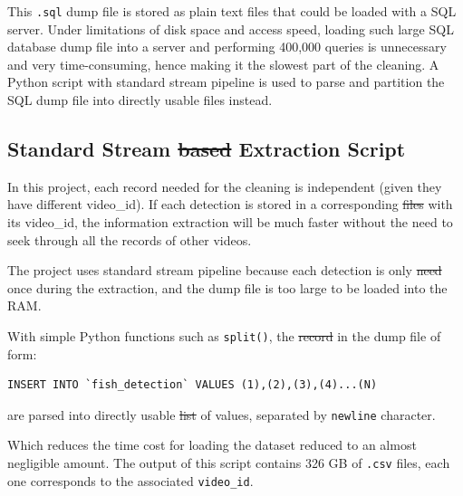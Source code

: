 \documentclass[bsc,logo,twoside,fullspacing,parskip]{infthesis}
\providecommand{\DIFadd}[1]{{\protect\color{blue}\uwave{#1}}} %
\providecommand{\DIFdel}[1]{{\protect\color{red}\sout{#1}}}                      %
\providecommand{\DIFaddbegin}{} %
\providecommand{\DIFaddend}{} %
\providecommand{\DIFdelbegin}{} %
\providecommand{\DIFdelend}{} %
\newcommand{\DIFscaledelfig}{0.5}
\newlength{\DIFdelgraphicswidth} %
\newlength{\DIFdelgraphicsheight} %
\newcommand{\DIFaddincludegraphics}[2][]{{\color{blue}\fbox{\DIFOincludegraphics[#1]{#2}}}} %
\newcommand{\DIFdelincludegraphics}[2][]{%
\sbox{\DIFdelgraphicsbox}{\DIFOincludegraphics[#1]{#2}}%
\settoboxwidth{\DIFdelgraphicswidth}{\DIFdelgraphicsbox} %
\settoboxtotalheight{\DIFdelgraphicsheight}{\DIFdelgraphicsbox} %
\scalebox{\DIFscaledelfig}{%
\parbox[b]{\DIFdelgraphicswidth}{\usebox{\DIFdelgraphicsbox}\\[-\baselineskip] \rule{\DIFdelgraphicswidth}{0em}}\llap{\resizebox{\DIFdelgraphicswidth}{\DIFdelgraphicsheight}{%
\setlength{\unitlength}{\DIFdelgraphicswidth}%
\begin{picture}(1,1)%
\thicklines\linethickness{2pt} %
{\color[rgb]{1,0,0}\put(0,0){\framebox(1,1){}}}%
{\color[rgb]{1,0,0}\put(0,0){\line( 1,1){1}}}%
{\color[rgb]{1,0,0}\put(0,1){\line(1,-1){1}}}%
\end{picture}%
}\hspace*{3pt}}} %
} %
\DeclareRobustCommand{\DIFaddbegin}{\DIFOaddbegin \let\includegraphics\DIFaddincludegraphics} %
\DeclareRobustCommand{\DIFaddend}{\DIFOaddend \let\includegraphics\DIFOincludegraphics} %
\DeclareRobustCommand{\DIFdelbegin}{\DIFOdelbegin \let\includegraphics\DIFdelincludegraphics} %
\DeclareRobustCommand{\DIFdelend}{\DIFOaddend \let\includegraphics\DIFOincludegraphics} %
\begin{document}
This {\tt .sql} dump file is stored as plain text files that could be loaded with a SQL server.
Under limitations of disk space and access speed, loading such large SQL database dump file into a server and performing 400,000 queries is unnecessary and very time-consuming, hence making it the slowest part of the cleaning. 
A Python script with standard stream pipeline is used to parse and partition the SQL dump file into directly usable files instead.

\subsection{Standard Stream \DIFdelbegin \DIFdel{based }\DIFdelend \DIFaddbegin \DIFadd{Based }\DIFaddend Extraction Script}

In this project, each record needed for the cleaning is independent (given they have different video\_id). 
If each detection is stored in a corresponding \DIFdelbegin \DIFdel{files }\DIFdelend \DIFaddbegin \DIFadd{file }\DIFaddend with its video\_id, the information extraction will be much faster without the need to seek through all the records of other videos.

The project uses \DIFaddbegin \DIFadd{a }\DIFaddend standard stream pipeline because each detection is only \DIFdelbegin \DIFdel{need }\DIFdelend \DIFaddbegin \DIFadd{needed }\DIFaddend once during the extraction, and the dump file is too large to be loaded into the RAM.

With simple Python functions such as {\tt split()}, the \DIFdelbegin \DIFdel{record }\DIFdelend \DIFaddbegin \DIFadd{records }\DIFaddend in the dump file of form:
\lstset{basicstyle=\small\ttfamily,breaklines=true,style=sql}
\begin{lstlisting}[frame=single]
 INSERT INTO `fish_detection` VALUES (1),(2),(3),(4)...(N)
\end{lstlisting}
are parsed into directly usable \DIFdelbegin \DIFdel{list }\DIFdelend \DIFaddbegin \DIFadd{lists }\DIFaddend of values, separated by \DIFaddbegin \DIFadd{a }\DIFaddend {\tt newline} character.

Which reduces the time cost for loading the dataset reduced to an almost negligible amount. 
The output of this script contains 326 GB of {\tt .csv} files, each one corresponds to the associated {\tt video\_id}.

\end{document}
